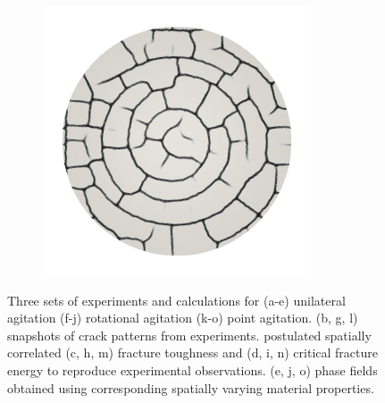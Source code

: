 \begin{figure}[htb!]
\begin{subfigure}{0.15\textwidth}
    \caption{}
  \end{subfigure}
  \begin{subfigure}{0.15\textwidth}
    \includegraphics[width=\textwidth]{Chapter4/figures/2D/d_ring.png}
    \caption{}
  \end{subfigure}
  \caption{Three sets of experiments and calculations for (a-e) unilateral agitation (f-j) rotational agitation (k-o) point agitation. (b, g, l) snapshots of crack patterns from experiments. postulated spatially correlated (c, h, m) fracture toughness and (d, i, n) critical fracture energy to reproduce experimental observations. (e, j, o) phase fields obtained using corresponding spatially varying material properties. }
  \label{fig: Chapter4/2D/japanese_experiments}
\end{figure}
